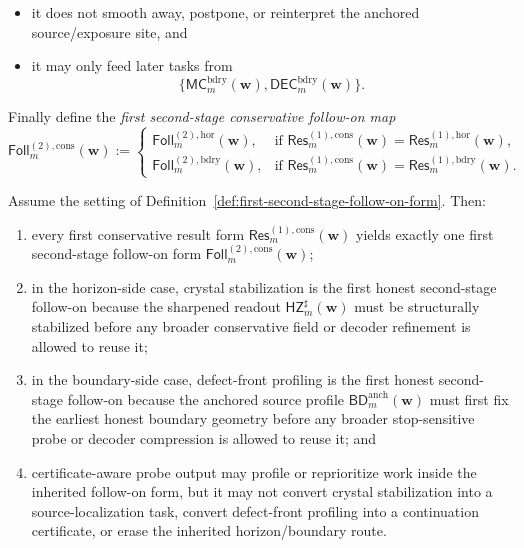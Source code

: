 \begin{definition}
\begin{enumerate}[label=(\roman*)]
\begin{itemize}[leftmargin=2em]
    \item it does not smooth away, postpone, or reinterpret the anchored source/exposure site, and
    \item it may only feed later tasks from
    \[
      \{\mathsf{MC}^{\mathrm{bdry}}_{m}(\mathbf w),\mathsf{DEC}^{\mathrm{bdry}}_{m}(\mathbf w)\}.
    \]
  \end{itemize}
\end{enumerate}
Finally define the \emph{first second-stage conservative follow-on map}
\[
  \mathsf{Foll}^{(2),\mathrm{cons}}_{m}(\mathbf w)
  :=
  \begin{cases}
    \mathsf{Foll}^{(2),\mathrm{hor}}_{m}(\mathbf w), & \text{if }\mathsf{Res}^{(1),\mathrm{cons}}_{m}(\mathbf w)=\mathsf{Res}^{(1),\mathrm{hor}}_{m}(\mathbf w),\\[2mm]
    \mathsf{Foll}^{(2),\mathrm{bdry}}_{m}(\mathbf w), & \text{if }\mathsf{Res}^{(1),\mathrm{cons}}_{m}(\mathbf w)=\mathsf{Res}^{(1),\mathrm{bdry}}_{m}(\mathbf w).
  \end{cases}
\]
\end{definition}

\begin{proposition}
\label{prop:every-first-conservative-result-surface-yields-exactly-one-first-second-stage-follow-on-form}
Assume the setting of Definition~\ref{def:first-second-stage-follow-on-form}. Then:
\begin{enumerate}[label=(\roman*)]
  \item every first conservative result form \(\mathsf{Res}^{(1),\mathrm{cons}}_{m}(\mathbf w)\) yields exactly one first second-stage follow-on form \(\mathsf{Foll}^{(2),\mathrm{cons}}_{m}(\mathbf w)\);
  \item in the horizon-side case, crystal stabilization is the first honest second-stage follow-on because the sharpened readout \(\mathsf{HZ}^{\sharp}_{m}(\mathbf w)\) must be structurally stabilized before any broader conservative field or decoder refinement is allowed to reuse it;
  \item in the boundary-side case, defect-front profiling is the first honest second-stage follow-on because the anchored source profile \(\mathsf{BD}^{\mathrm{anch}}_{m}(\mathbf w)\) must first fix the earliest honest boundary geometry before any broader stop-sensitive probe or decoder compression is allowed to reuse it; and
  \item certificate-aware probe output may profile or reprioritize work inside the inherited follow-on form, but it may not convert crystal stabilization into a source-localization task, convert defect-front profiling into a continuation certificate, or erase the inherited horizon/boundary route.
\end{enumerate}
\end{proposition}

